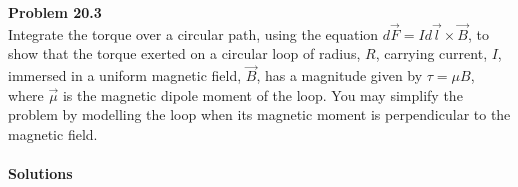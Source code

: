 \begin{framed}
\textbf{Problem 20.3}\\
Integrate the torque over a circular path, using the equation $d\vec F = Id\vec l \times \vec B$, to show that the torque exerted on a circular loop of radius, $R$, carrying current, $I$, immersed in a uniform magnetic field, $\vec B$, has a magnitude given by $\tau=\mu B$, where $\vec \mu$ is the magnetic dipole moment of the loop. You may simplify the problem by modelling the loop when its magnetic moment is perpendicular to the magnetic field.
\end{framed}

\paragraph{Solutions}

